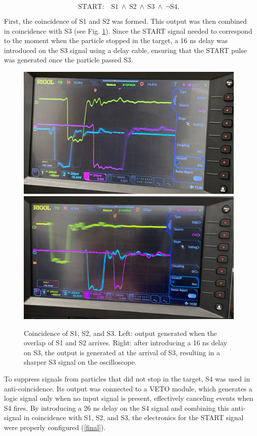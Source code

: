 \documentclass[11pt,a4paper]{article}
\begin{document}
\begin{equation*}
    \text{START:} \quad \text{S1} \: \land \: \text{S2}\: \land \: \text{S3} \: \land \: \lnot \text{S4}.
\end{equation*}
    
First, the coincidence of S1 and S2 was formed. This output was then combined in coincidence with S3 (see Fig. \ref{S3}). Since the START signal needed to correspond to the moment when the particle stopped in the target, a 16 ns delay was introduced on the S3 signal using a delay cable, ensuring that the START pulse was generated once the particle passed S3.

\begin{figure}[h]
    \centering
    \includegraphics[width=0.48\linewidth]{123.jpeg}
    \includegraphics[width=0.48\linewidth]{123 delayed.jpeg}
    \caption{Coincidence of S1, S2, and S3. Left: output generated when the overlap of S1 and S2 arrives. Right: after introducing a 16 ns delay on S3, the output is generated at the arrival of S3, resulting in a sharper S3 signal on the oscilloscope.}
    \label{S3}
\end{figure}

To suppress signals from particles that did not stop in the target, S4 was used in anti-coincidence. Its output was connected to a VETO module, which generates a logic signal only when no input signal is present, effectively canceling events when S4 fires. By introducing a 26 ns delay on the S4 signal and combining this anti-signal in coincidence with S1, S2, and S3, the electronics for the START signal were properly configured (\ref{final}). 
\end{document}

